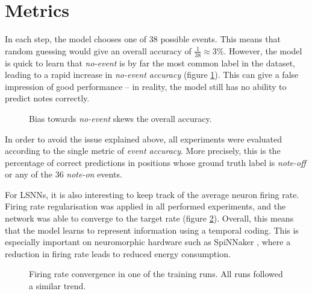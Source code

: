 \documentclass[../../report.tex]{subfiles}
\begin{document}
\section{Metrics}

In each step, the model chooses one of 38 possible events. This means that
random guessing would give an overall accuracy of \(\frac{1}{38} \approx 3\%\).
However, the model is quick to learn that \emph{no-event} is by far the most
common label in the dataset, leading to a rapid increase in \emph{no-event
accuracy} (figure \ref{fig:initial-accuracy}). This can give a false impression
of good performance -- in reality, the model still has no ability to predict
notes correctly.

\begin{figure}
  \centering
  \caption{Bias towards \emph{no-event} skews the overall accuracy.}
  \label{fig:initial-accuracy}
\end{figure}

In order to avoid the issue explained above, all experiments were evaluated
according to the single metric of \emph{event accuracy}. More precisely, this is
the percentage of correct predictions in positions whose ground truth label is
\emph{note-off} or any of the 36 \emph{note-on} events.

For LSNNs, it is also interesting to keep track of the average neuron firing
rate. Firing rate regularisation was applied in all performed experiments, and
the network was able to converge to the target rate (figure
\ref{fig:firing-rate}). Overall, this means that the model learns to represent
information using a temporal coding. This is especially important on
neuromorphic hardware such as SpiNNaker \cite{Furber2014}, where a reduction in
firing rate leads to reduced energy consumption.

\begin{figure}
  \centering
  \caption{Firing rate convergence in one of the training runs. All runs
  followed a similar trend.}
  \label{fig:firing-rate}
\end{figure}
\end{document}
